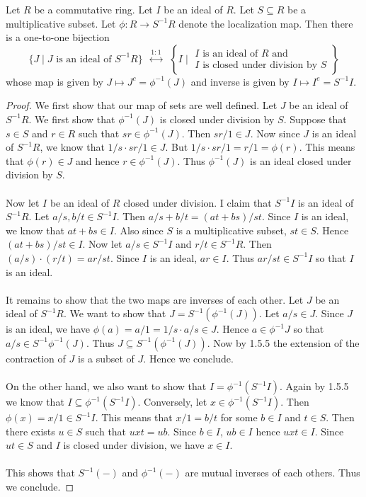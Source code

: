 \documentclass[a4paper]{article}
\begin{document}
\begin{thm}{}{} Let $R$ be a commutative ring. Let $I$ be an ideal of $R$. Let $S\subseteq R$ be a multiplicative subset. Let $\phi:R\to S^{-1}R$ denote the localization map. Then there is a one-to-one bijection $$\{J\;|\;J\text{ is an ideal of }S^{-1}R\}\;\;\overset{1:1}{\longleftrightarrow}\;\;\left\{I\;|\;\substack{I\text{ is an ideal of }R\text{ and }\\I\text{ is closed under division by }S}\right\}$$ whose map is given by $J\mapsto J^c=\phi^{-1}(J)$ and inverse is given by $I\mapsto I^e=S^{-1}I$. \tcbline
\begin{proof}
We first show that our map of sets are well defined. Let $J$ be an ideal of $S^{-1}R$. We first show that $\phi^{-1}(J)$ is closed under division by $S$. Suppose that $s\in S$ and $r\in R$ such that $sr\in\phi^{-1}(J)$. Then $sr/1\in J$. Now since $J$ is an ideal of $S^{-1}R$, we know that $1/s\cdot sr/1\in J$. But $1/s\cdot sr/1=r/1=\phi(r)$. This means that $\phi(r)\in J$ and hence $r\in\phi^{-1}(J)$. Thus $\phi^{-1}(J)$ is an ideal closed under division by $S$. \\~\\

Now let $I$ be an ideal of $R$ closed under division. I claim that $S^{-1}I$ is an ideal of $S^{-1}R$. Let $a/s,b/t\in S^{-1}I$. Then $a/s+b/t=(at+bs)/st$. Since $I$ is an ideal, we know that $at+bs\in I$. Also since $S$ is a multiplicative subset, $st\in S$. Hence $(at+bs)/st\in I$. Now let $a/s\in S^{-1}I$ and $r/t\in S^{-1}R$. Then $(a/s)\cdot(r/t)=ar/st$. Since $I$ is an ideal, $ar\in I$. Thus $ar/st\in S^{-1}I$ so that $I$ is an ideal. \\~\\

It remains to show that the two maps are inverses of each other. Let $J$ be an ideal of $S^{-1}R$. We want to show that $J=S^{-1}(\phi^{-1}(J))$. Let $a/s\in J$. Since $J$ is an ideal, we have $\phi(a)=a/1=1/s\cdot a/s\in J$. Hence $a\in\phi^{-1}J$ so that $a/s\in S^{-1}\phi^{-1}(J)$. Thus $J\subseteq S^{-1}(\phi^{-1}(J))$. Now by 1.5.5 the extension of the contraction of $J$ is a subset of $J$. Hence we conclude. \\~\\

On the other hand, we also want to show that $I=\phi^{-1}(S^{-1}I)$. Again by 1.5.5 we know that $I\subseteq\phi^{-1}(S^{-1}I)$. Conversely, let $x\in\phi^{-1}(S^{-1}I)$. Then $\phi(x)=x/1\in S^{-1}I$. This means that $x/1=b/t$ for some $b\in I$ and $t\in S$. Then there exists $u\in S$ such that $uxt=ub$. Since $b\in I$, $ub\in I$ hence $uxt\in I$. Since $ut\in S$ and $I$ is closed under division, we have $x\in I$. \\~\\

This shows that $S^{-1}(-)$ and $\phi^{-1}(-)$ are mutual inverses of each others. Thus we conclude. 
\end{proof}
\end{thm}
\end{document}

